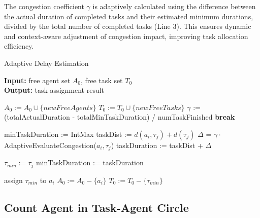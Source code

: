 \documentclass[letterpaper]{article} %
\begin{document}
The congestion coefficient $\gamma$ is adaptively calculated using the difference between the actual duration of completed tasks and their estimated minimum durations, divided by the total number of completed tasks (Line 3). 
This ensures dynamic and context-aware adjustment of congestion impact, improving task allocation efficiency. 

\begin{algorithm}
    \caption{Adaptive Delay Estimation}
    \label{alg:adaptive_congestion_estimation} 
    \textbf{Input:} free agent set $A_0$, free task set $T_0$ \\
    \textbf{Output:} task assignment result
    \begin{algorithmic}[1]

    \STATE $A_0 := A_0 \cup \{newFreeAgents\}$
    \STATE $T_0 := T_0 \cup \{newFreeTasks\}$
    \STATE $\gamma$ := (totalActualDuration - totalMinTaskDuration) / numTaskFinished
            \STATE \textbf{break}
        \ENDIF

        \STATE minTaskDuration := IntMax
            \STATE taskDist := $d(a_i, \tau_j) + d(\tau_j)$
            \STATE $\Delta$  = $\gamma \cdot $ AdaptiveEvaluateCongestion($a_i, \tau_j$) 
            \STATE taskDuration := taskDist + $\Delta$

                \STATE $\tau_{min} := \tau_j$
                \STATE minTaskDuration := taskDuration
            \ENDIF
        \ENDFOR
        
        \STATE assign $\tau_{min}$ to $a_i$
        \STATE $ A_0 := A_0 - \{a_i\} $
        \STATE $ T_0 := T_0 - \{\tau_{min}\} $
    \ENDFOR

    \end{algorithmic}
\end{algorithm}


\subsection{Count Agent in Task-Agent Circle}\label{sec:adaptive_jam_task_circle_count_current}
\end{document}
